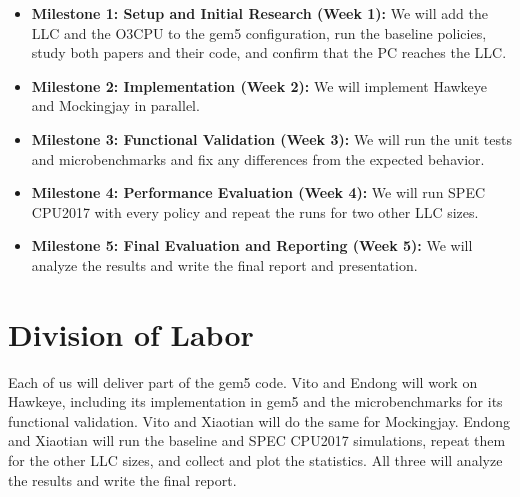 \documentclass[lettersize,journal]{IEEEtran}
\begin{document}
\begin{itemize}
\item \textbf{Milestone 1: Setup and Initial Research (Week 1):} We will add
the LLC and the O3CPU to the gem5 configuration, run the baseline policies, study
both papers and their code, and confirm that the PC reaches the LLC.
\item \textbf{Milestone 2: Implementation (Week 2):} We will implement Hawkeye
and Mockingjay in parallel.
\item \textbf{Milestone 3: Functional Validation (Week 3):} We will run the unit
tests and microbenchmarks and fix any differences from the expected behavior.
\item \textbf{Milestone 4: Performance Evaluation (Week 4):} We will run SPEC
CPU2017 with every policy and repeat the runs for two other LLC sizes.
\item \textbf{Milestone 5: Final Evaluation and Reporting (Week 5):} We will
analyze the results and write the final report and presentation.
\end{itemize}

\section{Division of Labor}

Each of us will deliver part of the gem5 code. Vito and Endong will work on
Hawkeye, including its implementation in gem5 and the microbenchmarks for its
functional validation. Vito and Xiaotian will do the same for Mockingjay.
Endong and Xiaotian will run the baseline and SPEC CPU2017 simulations, repeat
them for the other LLC sizes, and collect and plot the statistics. All three will
analyze the results and write the final report.
\end{document}
